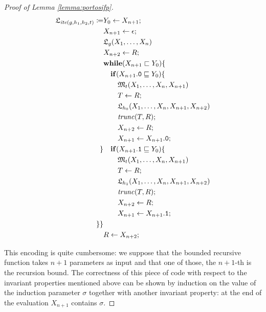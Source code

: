 \begin{proof}[Proof of Lemma \ref{lemma:portosifp}]
\begin{align*}
{\mathfrak L_{\mathit{ite}(g, h_1, h_2, t)}}\coloneqq
&Y_0 \leftarrow X_{n+1};\\
&X_{n+1} \leftarrow \epsilon;\\
& {\mathfrak L_{g}}(X_1, \ldots, X_n)\\
& X_{n+2} \leftarrow R;\\
& \mathbf{while}(X_{n+1} \sqsubset Y_0)\{\\
&\quad \mathbf{if}(X_{n+1}.\mathtt{0}\sqsubseteq Y_0 )\{\\
&\quad\quad \mathfrak M_t(X_1, \ldots, X_n, X_{n+1})\\
&\quad\quad T \leftarrow R;\\
&\quad \quad {\mathfrak L_{h_0}}(X_1, \ldots, X_n, X_{n+1}, X_{n+2})\\
&\quad\quad \mathit{trunc}(T, R);\\
&\quad\quad X_{n+2} \leftarrow R;\\
&\quad\quad X_{n+1}\leftarrow X_{n+1}.\mathtt{0};\\
 \}
& \quad \mathbf{if}(X_{n+1}.\mathtt{1}\sqsubseteq Y_0)\{\\
&\quad\quad \mathfrak M_t(X_1, \ldots, X_n, X_{n+1})\\
&\quad\quad T \leftarrow R;\\
&\quad \quad {\mathfrak L_{h_1}}(X_1, \ldots, X_n, X_{n+1}, X_{n+2})\\
&\quad\quad \mathit{trunc}(T, R);\\
&\quad\quad X_{n+2} \leftarrow R;\\
&\quad\quad X_{n+1}\leftarrow X_{n+1}.\mathtt{1};\\
 \}
\}\\
&R \leftarrow X_{n+2};\\
\end{align*}
\normalsize

This encoding is quite cumbersome: we suppose that the bounded
recursive function takes $n+1$ parameters as input and that one of those,
the $n+1$-th is the recursion bound.
%
The correctness of this piece of code with respect to the
invariant properties mentioned above can be shown by induction on the value of
the induction parameter $\sigma$ together with another invariant property:
at the end of the evaluation $X_{n+1}$ contains $\sigma$.


\end{proof}
